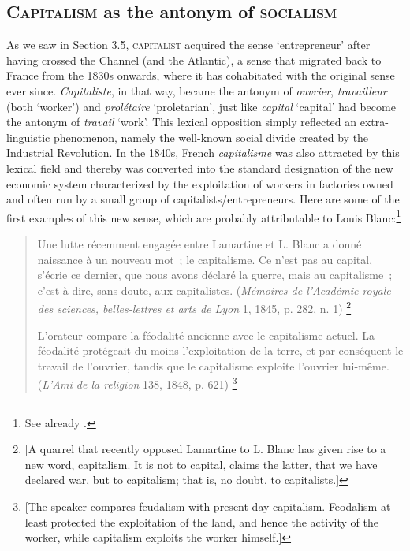 \documentclass[output=paper]{langsci/langscibook}
\begin{document}
\subsection{\textsc{Capitalism} as the antonym of \textsc{socialism}}
\largerpage[-1]
As we saw in Section 3.5, \textsc{capitalist} acquired the sense
`entrepreneur' after having crossed the Channel (and the Atlantic), a
sense that migrated back to France from the 1830s onwards, where it has
cohabitated with the original sense ever since. \emph{Capitaliste}, in
that way, became the antonym of \emph{ouvrier}, \emph{travailleur} (both
`worker') and \emph{prolétaire} `proletarian', just like \emph{capital}
`capital' had become the antonym of \emph{travail} `work'. This lexical
opposition simply reflected an extra-linguistic phenomenon,
namely the well-known social divide created by the Industrial Revolution.
In the 1840s, French \emph{capitalisme} was also attracted by this
lexical field and thereby was converted into the standard designation of the
new economic system characterized by the exploitation of workers in
factories owned and often run by a small group of
capitalists/entrepreneurs. Here are some of the first examples of this
new sense, which are probably attributable to Louis Blanc:\footnote{See already%
\citet{Silberner1940}%
%
.}

\begin{quote}
Une lutte récemment engagée entre Lamartine et L. Blanc a donné
naissance à un nouveau mot~; le capitalisme. Ce n'est pas au capital,
s'écrie ce dernier, que nous avons déclaré la guerre, mais au
capitalisme~; c'est-à-dire, sans doute, aux capitalistes. (\emph{Mémoires de l'Académie royale des sciences,
belles-lettres et arts de Lyon} 1, 1845, p. 282, n. 1)%
\footnote{{[}A
  quarrel that recently opposed Lamartine to L. Blanc has given rise to
  a new word, capitalism. It is not to capital, claims the latter, that
  we have declared war, but to capitalism; that is, no doubt, to
  capitalists.{]}}

L'orateur compare la féodalité ancienne avec le capitalisme actuel. La
féodalité protégeait du moins l'exploitation de la terre, et par
conséquent le travail de l'ouvrier, tandis que le capitalisme exploite
l'ouvrier lui-même. (\emph{L'Ami de la religion} 138,
1848, p. 621)%
\footnote{{[}The speaker compares feudalism with
  present-day capitalism. Feodalism at least protected the exploitation
  of the land, and hence the activity of the worker, while capitalism
  exploits the worker himself.{]}}
\end{quote}
\end{document}
